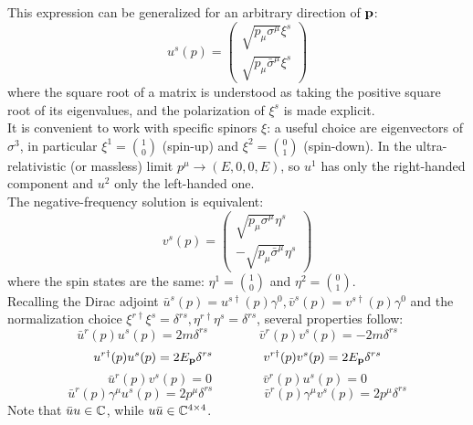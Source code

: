 This expression can be generalized for an arbitrary direction of $ \mathbf{p} $:
\begin{equation}
  u^s(p) =
  \begin{pmatrix}
    \sqrt{p_\mu \sigma^\mu} \xi^s \\
    \sqrt{p_\mu \bar{\sigma}^\mu} \xi^s
  \end{pmatrix}
  \label{eq:1.94}
\end{equation}
where the square root of a matrix is understood as taking the positive square root of its eigenvalues, and the polarization of $ \xi^s $ is made explicit.\\
It is convenient to work with specific spinors $ \xi $: a useful choice are eigenvectors of $ \sigma^3 $, in particular $ \xi^1 = \binom{1}{0} $ (spin-up) and $ \xi^2 = \binom{0}{1} $ (spin-down). In the ultra-relativistic (or massless) limit $ p^\mu \rightarrow (E, 0, 0, E) $, so $ u^1 $ has only the right-handed component and $ u^2 $ only the left-handed one.\\
The negative-frequency solution is equivalent:
\begin{equation}
  v^s(p) =
    \begin{pmatrix}
      \sqrt{p_\mu \sigma^\mu} \eta^s \\
      -\sqrt{p_\mu \bar{\sigma}^\mu} \eta^s
    \end{pmatrix}
  \label{eq:1.95}
\end{equation}
where the spin states are the same: $ \eta^1 = \binom{1}{0} $ and $ \eta^2 = \binom{0}{1} $.\\
Recalling the Dirac adjoint $ \bar{u}^s(p) = u^{s \dagger}(p) \gamma^0 , \bar{v}^s(p) = v^{s \dagger}(p) \gamma^0 $ and the normalization choice $ \xi^{r \dagger} \xi^s = \delta^{rs} , \eta^{r \dagger} \eta^s = \delta^{rs} $, several properties follow:
\begin{equation}
  \bar{u}^r(p) u^s(p) = 2m \delta^{rs}
  \qquad \qquad
  \bar{v}^r(p) v^s(p) = -2m \delta^{rs}
  \label{eq:1.96}
\end{equation}
\begin{equation}
  u^{r \dagger}(p) u^s(p) = 2E_{\mathbf{p}} \delta^{rs}
  \qquad \qquad
  v^{r \dagger}(p) v^s(p) = 2E_{\mathbf{p}} \delta^{rs}
  \label{eq:1.97}
\end{equation}
\begin{equation}
  \bar{u}^r(p) v^s(p) = 0
  \qquad \qquad
  \bar{v}^r(p) u^s(p) = 0
  \label{eq:1.98}
\end{equation}
\begin{equation}
  \bar{u}^r(p) \gamma^\mu u^s(p) = 2 p^\mu \delta^{rs}
  \qquad \qquad
  \bar{v}^r(p) \gamma^\mu v^s(p) = 2 p^\mu \delta^{rs}
  \label{eq:1.99}
\end{equation}
Note that $ \bar{u}u \in \mathbb{C} $, while $ u\bar{u} \in \mathbb{C}^{4 \times 4} $.

